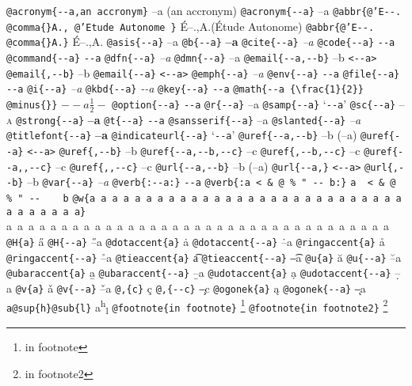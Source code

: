 \documentclass{book}
\begin{document}
\begin{titlepage}
\texttt{@acronym\{{-}{-}a,an accronym\}} --a (an accronym)
\texttt{@acronym\{{-}{-}a\}} --a
\texttt{@abbr\{@'E{-}{-}. @comma\{\}A., @'Etude Autonome \}} \'{E}--.\@ ,A.\@ (\'{E}tude Autonome)
\texttt{@abbr\{@'E{-}{-}. @comma\{\}A.\}} \'{E}--.\@ ,A.\@
\texttt{@asis\{{-}{-}a\}} --a
\texttt{@b\{{-}{-}a\}} \textbf{--a}
\texttt{@cite\{{-}{-}a\}} \textit{--a}
\texttt{@code\{{-}{-}a\}} \texttt{{-}{-}a}
\texttt{@command\{{-}{-}a\}} \texttt{{-}{-}a}
\texttt{@dfn\{{-}{-}a\}} \emph{--a}
\texttt{@dmn\{{-}{-}a\}} --a
\texttt{@email\{{-}{-}a,{-}{-}b\}} --b \texttt{<{-}{-}a>}
\texttt{@email\{,{-}{-}b\}} --b
\texttt{@email\{{-}{-}a\}} \texttt{<{-}{-}a>}
\texttt{@emph\{{-}{-}a\}} \emph{--a}
\texttt{@env\{{-}{-}a\}} \texttt{{-}{-}a}
\texttt{@file\{{-}{-}a\}} \texttt{{-}{-}a}
\texttt{@i\{{-}{-}a\}} \textit{--a}
\texttt{@kbd\{{-}{-}a\}} {\ttfamily\textsl{{-}{-}a}}
\texttt{@key\{{-}{-}a\}} \texttt{{-}{-}a}
\texttt{@math\{{-}{-}a \{\textbackslash{}frac\{1\}\{2\}\} @minus\{\}\}} $--a {\frac{1}{2}} -$
\texttt{@option\{{-}{-}a\}} \texttt{{-}{-}a}
\texttt{@r\{{-}{-}a\}} \textrm{--a}
\texttt{@samp\{{-}{-}a\}} `\texttt{{-}{-}a}'
\texttt{@sc\{{-}{-}a\}} \textsc{--a}
\texttt{@strong\{{-}{-}a\}} \textbf{--a}
\texttt{@t\{{-}{-}a\}} \texttt{{-}{-}a}
\texttt{@sansserif\{{-}{-}a\}} \textsf{--a}
\texttt{@slanted\{{-}{-}a\}} \textsl{--a}
\texttt{@titlefont\{{-}{-}a\}} {\Huge \bfseries --a}
\texttt{@indicateurl\{{-}{-}a\}} `\texttt{{-}{-}a}'
\texttt{@uref\{{-}{-}a,{-}{-}b\}} --b (--a)
\texttt{@uref\{{-}{-}a\}} \texttt{<{-}{-}a>}
\texttt{@uref\{,{-}{-}b\}} --b
\texttt{@uref\{{-}{-}a,{-}{-}b,{-}{-}c\}} --c
\texttt{@uref\{,{-}{-}b,{-}{-}c\}} --c
\texttt{@uref\{{-}{-}a,,{-}{-}c\}} --c
\texttt{@uref\{,,{-}{-}c\}} --c
\texttt{@url\{{-}{-}a,{-}{-}b\}} --b (--a)
\texttt{@url\{{-}{-}a,\}} \texttt{<{-}{-}a>}
\texttt{@url\{,{-}{-}b\}} --b
\texttt{@var\{{-}{-}a\}} \emph{--a}
\texttt{@verb\{:{-}{-}a:\}} \verb:--a:
\texttt{@verb\{:a  < \& @ \% " {-}{-}    b:\}} \verb:a  < & @ % " --    b:
\texttt{@w\{a a a a a a a a a a a a a a a a a a a a a a a a a a a a a a a a a a a\}} \hbox{a a a a a a a a a a a a a a a a a a a a a a a a a a a a a a a a a a a}
\texttt{@H\{a\}} \H{a}
\texttt{@H\{{-}{-}a\}} \H{--a}
\texttt{@dotaccent\{a\}} \.{a}
\texttt{@dotaccent\{{-}{-}a\}} \.{--a}
\texttt{@ringaccent\{a\}} \r{a}
\texttt{@ringaccent\{{-}{-}a\}} \r{--a}
\texttt{@tieaccent\{a\}} \t{a}
\texttt{@tieaccent\{{-}{-}a\}} \t{--a}
\texttt{@u\{a\}} \u{a}
\texttt{@u\{{-}{-}a\}} \u{--a}
\texttt{@ubaraccent\{a\}} \b{a}
\texttt{@ubaraccent\{{-}{-}a\}} \b{--a}
\texttt{@udotaccent\{a\}} \d{a}
\texttt{@udotaccent\{{-}{-}a\}} \d{--a}
\texttt{@v\{a\}} \v{a}
\texttt{@v\{{-}{-}a\}} \v{--a}
\texttt{@,\{c\}} \c{c}
\texttt{@,\{{-}{-}c\}} \c{--c}
\texttt{@ogonek\{a\}} \k{a}
\texttt{@ogonek\{{-}{-}a\}} \k{--a}
\texttt{a@sup\{h\}@sub\{l\}} a\textsuperscript{h}\textsubscript{l}
\texttt{@footnote\{in footnote\}} \footnote{in footnote}
\texttt{@footnote\{in footnote2\}} \footnote{in footnote2}


\end{titlepage}
\end{document}
